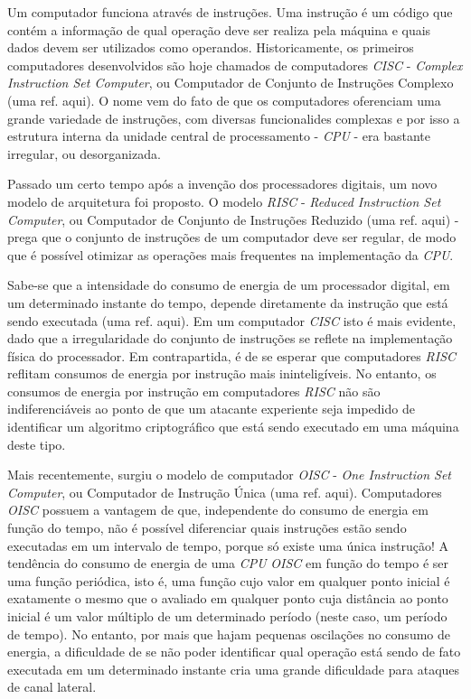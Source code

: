 Um computador funciona através de instruções. Uma instrução é um código que contém a informação de qual operação deve ser realiza pela máquina e quais dados devem ser utilizados como operandos. Historicamente, os primeiros computadores desenvolvidos são hoje chamados de computadores \textit{CISC} - \textit{Complex Instruction Set Computer}, ou Computador de Conjunto de Instruções Complexo (uma ref. aqui). O nome vem do fato de que os computadores oferenciam uma grande variedade de instruções, com diversas funcionalides complexas e por isso a estrutura interna da unidade central de processamento - \textit{CPU} - era bastante irregular, ou desorganizada.

Passado um certo tempo após a invenção dos processadores digitais, um novo modelo de arquitetura foi proposto. O modelo \textit{RISC} - \textit{Reduced Instruction Set Computer}, ou Computador de Conjunto de Instruções Reduzido (uma ref. aqui) - prega que o conjunto de instruções de um computador deve ser regular, de modo que é possível otimizar as operações mais frequentes na implementação da \textit{CPU}.

Sabe-se que a intensidade do consumo de energia de um processador digital, em um determinado instante do tempo, depende diretamente da instrução que está sendo executada (uma ref. aqui). Em um computador \textit{CISC} isto é mais evidente, dado que a irregularidade do conjunto de instruções se reflete na implementação física do processador. Em contrapartida, é de se esperar que computadores \textit{RISC} reflitam consumos de energia por instrução mais ininteligíveis. No entanto, os consumos de energia por instrução em computadores \textit{RISC} não são indiferenciáveis ao ponto de que um atacante experiente seja impedido de identificar um algoritmo criptográfico que está sendo executado em uma máquina deste tipo.

Mais recentemente, surgiu o modelo de computador \textit{OISC} - \textit{One Instruction Set Computer}, ou Computador de Instrução Única (uma ref. aqui). Computadores \textit{OISC} possuem a vantagem de que, independente do consumo de energia em função do tempo, não é possível diferenciar quais instruções estão sendo executadas em um intervalo de tempo, porque só existe uma única instrução! A tendência do consumo de energia de uma \textit{CPU} \textit{OISC} em função do tempo é ser uma função periódica, isto é, uma função cujo valor em qualquer ponto inicial é exatamente o mesmo que o avaliado em qualquer ponto cuja distância ao ponto inicial é um valor múltiplo de um determinado período (neste caso, um período de tempo). No entanto, por mais que hajam pequenas oscilações no consumo de energia, a dificuldade de se não poder identificar qual operação está sendo de fato executada em um determinado instante cria uma grande dificuldade para ataques de canal lateral.

